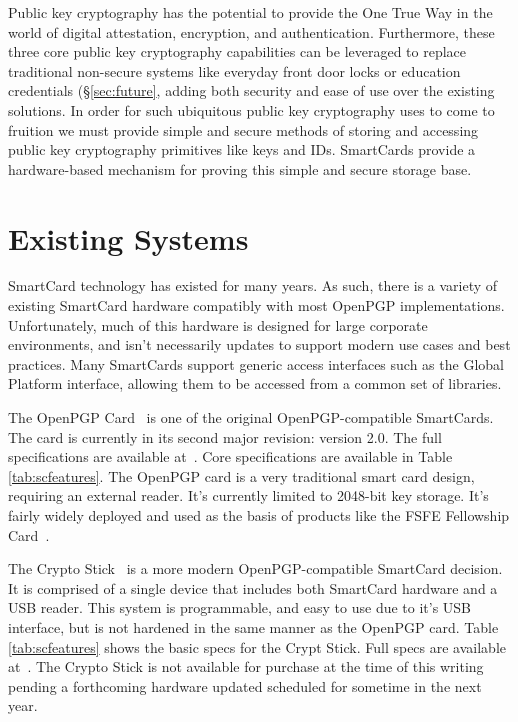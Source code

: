 \documentclass[11pt, twocolumn]{article}
\begin{document}
Public key cryptography has the potential to provide the One True
Way\texttrademark{} in the world of digital attestation, encryption, and
authentication. Furthermore, these three core public key cryptography
capabilities can be leveraged to replace traditional non-secure
systems like everyday front door locks or education credentials
(\S\ref{sec:future}, adding both security and ease of use over the
existing solutions. In order for such ubiquitous public key
cryptography uses to come to fruition we must provide simple and
secure methods of storing and accessing public key cryptography
primitives like keys and IDs. SmartCards provide a hardware-based
mechanism for proving this simple and secure storage base.

\section{Existing Systems}
\label{sec:exisitng}

SmartCard technology has existed for many years. As such, there is a
variety of existing SmartCard hardware compatibly with most OpenPGP
implementations. Unfortunately, much of this hardware is designed for
large corporate environments, and isn't necessarily updates to support
modern use cases and best practices. Many SmartCards support generic
access interfaces such as the Global Platform
interface\cite{globalplatform}, allowing them to be accessed from a
common set of libraries.

The OpenPGP Card~\cite{openpgpcard} is one of the original
OpenPGP-compatible SmartCards. The card is currently in its second
major revision: version 2.0. The full specifications are available
at~\cite{openpgpcard-doc-2.0}. Core specifications are available in
Table \ref{tab:scfeatures}. The OpenPGP card is a very traditional
smart card design, requiring an external reader. It's currently
limited to 2048-bit key storage. It's fairly widely deployed and used
as the basis of products like the FSFE Fellowship
Card~\cite{fellowshipcard}.

The Crypto Stick~\cite{cryptostick} is a more modern
OpenPGP-compatible SmartCard decision. It is comprised of a single
device that includes both SmartCard hardware and a USB reader. This
system is programmable, and easy to use due to it's USB interface, but
is not hardened in the same manner as the OpenPGP card. Table
\ref{tab:scfeatures} shows the basic specs for the Crypt Stick. Full
specs are available at~\cite{cryptostick-wiki}. The Crypto Stick is
not available for purchase at the time of this writing pending a
forthcoming hardware updated scheduled for sometime in the next year.
\end{document}
